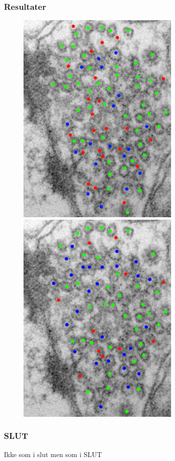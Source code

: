 \documentclass[12pt,t]{beamer}
\begin{document}

\begin{frame}
\frametitle{Resultater}
\begin{figure}[H]
	\centering
	\begin{minipage}[b]{0.49\linewidth}
		\includegraphics[scale=1]{../files/postmethod/img/eval_1-1.png}
	\end{minipage}
	\begin{minipage}[b]{0.49\linewidth}
		\includegraphics[scale=1]{../files/postmethod/img/eval_1-2.png}
	\end{minipage}
\end{figure}
\end{frame}




\begin{frame}
\frametitle{SLUT}
Ikke som i slut men som i SLUT
\end{frame}
\end{document}
